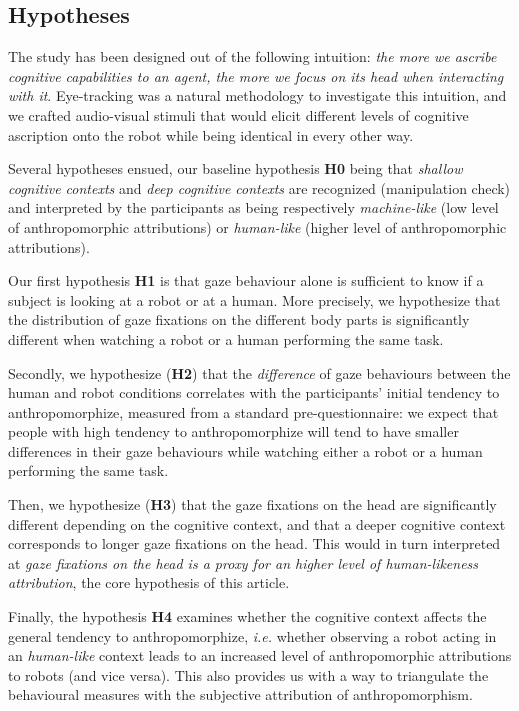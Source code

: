 \documentclass[lettersize, noapacite, twoside, HRI]{apa_HRI}
\newcommand{\ie}{\textit{i.e.}\xspace}
\newcommand{\h}[1]{\textbf{H#1}\xspace}
\begin{document}
\subsection*{Hypotheses}

The study has been designed out of the following intuition: \emph{the more we
ascribe cognitive capabilities to an agent, the more we focus on its head when
interacting with it}.  Eye-tracking was a natural methodology to investigate
this intuition, and we crafted audio-visual stimuli that would elicit different
levels of cognitive ascription onto the robot while being identical in every
other way.

Several hypotheses ensued, our baseline hypothesis \h{0} being that \emph{shallow
cognitive contexts} and \emph{deep cognitive contexts} are recognized
(manipulation check) and interpreted by the participants as being respectively
\emph{machine-like} (low level of anthropomorphic attributions) or
\emph{human-like} (higher level of anthropomorphic attributions).

Our first hypothesis \h{1} is that gaze behaviour alone is sufficient to
know if a subject is looking at a robot or at a human.  More precisely, we
hypothesize that the distribution of gaze fixations on the different body parts
is significantly different when watching a robot or a human performing the same
task.

Secondly, we hypothesize (\h{2}) that the \emph{difference} of gaze
behaviours between the human and robot conditions correlates with the
participants' initial tendency to anthropomorphize, measured from a standard
pre-questionnaire: we expect that people with high tendency to anthropomorphize
will tend to have smaller differences in their gaze behaviours while watching
either a robot or a human performing the same task.

Then, we hypothesize (\h{3}) that the gaze fixations on the head are significantly
different depending on the cognitive context, and that a deeper cognitive
context corresponds to longer gaze fixations on the head. This would in turn
interpreted at \emph{gaze fixations on the head is a proxy for an higher
level of human-likeness attribution}, the core hypothesis of this article.

Finally, the hypothesis \h{4} examines whether the cognitive context affects the
general tendency to anthropomorphize, \ie whether observing a
robot acting in an \emph{human-like} context leads to an increased level of
anthropomorphic attributions to robots (and vice versa). This also provides us
with a way to triangulate the behavioural measures with the subjective
attribution of anthropomorphism.
\end{document}
